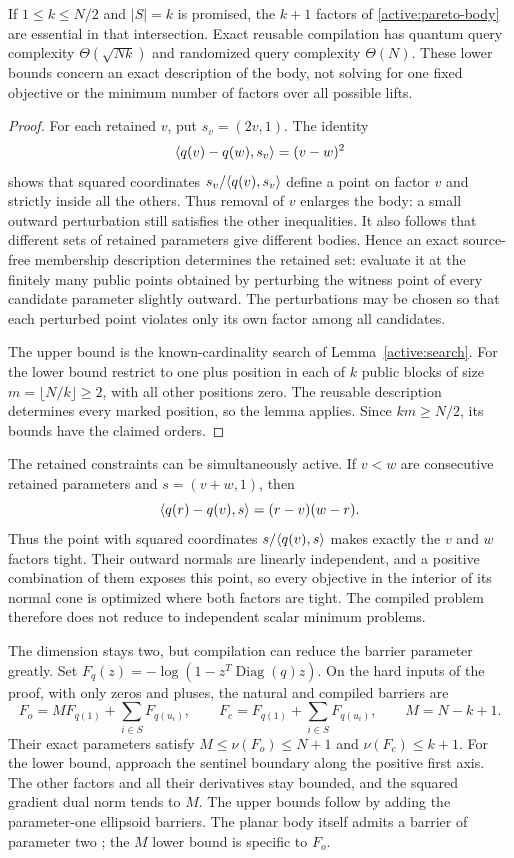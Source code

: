 \begin{proposition}\label{active:pareto}
If $1\leq k\leq N/2$ and $|S|=k$ is promised, the $k+1$
factors of \eqref{active:pareto-body} are essential in that intersection.
Exact reusable compilation
has quantum query complexity $\Theta(\sqrt{Nk})$ and randomized query
complexity $\Theta(N)$. These lower bounds concern an exact description
of the body, not solving for one fixed objective or the minimum number
of factors over all possible lifts.
\end{proposition}
\begin{proof}
For each retained $v$, put $s_v=(2v,1)$. The identity
\[
 \langle q(v)-q(w),s_v\rangle=(v-w)^2
\]
shows that squared coordinates
$s_v/\langle q(v),s_v\rangle$ define a point on factor $v$ and strictly
inside all the others. Thus removal of $v$ enlarges the body:
a small outward perturbation still satisfies the other inequalities.
It also follows that different sets of retained parameters give
different bodies. Hence an exact source-free membership description
determines the retained set: evaluate it at the
finitely many public points obtained by perturbing the witness point
of every candidate parameter slightly outward. The perturbations may
be chosen so that each perturbed point violates only its own factor
among all candidates.

The upper bound is the known-cardinality search of
Lemma~\ref{active:search}. For the lower bound restrict to one plus
position in each of $k$ public blocks of size
$m=\lfloor N/k\rfloor\geq2$, with all other positions zero.
The reusable description determines every marked position, so the
lemma applies. Since $km\geq N/2$, its bounds have the claimed orders.
\end{proof}

The retained constraints can be simultaneously active. If $v<w$
are consecutive retained parameters and $s=(v+w,1)$, then
\[
 \langle q(r)-q(v),s\rangle=(r-v)(w-r).
\]
Thus the point with squared coordinates $s/\langle q(v),s\rangle$ makes exactly
the $v$ and $w$ factors tight. Their outward normals are linearly
independent, and a positive combination of them exposes this point, so
every objective in the interior of its normal cone is optimized where
both factors are tight. The compiled problem therefore does not reduce
to independent scalar minimum problems.

The dimension stays two, but compilation can reduce the barrier
parameter greatly.
Set $F_q(z)=-\log(1-z^T\operatorname{Diag}(q)z)$.
On the hard inputs of the proof, with only zeros and pluses, the
natural and compiled barriers are
\begin{equation}\label{active:pareto-barriers}
 F_o=M F_{q(1)}+\sum_{i\in S}F_{q(u_i)},\qquad
 F_c=F_{q(1)}+\sum_{i\in S}F_{q(u_i)},\qquad M=N-k+1.
\end{equation}
Their exact parameters satisfy
$M\leq\nu(F_o)\leq N+1$ and $\nu(F_c)\leq k+1$.
For the lower bound, approach the sentinel boundary along the positive
first axis. The other factors and all their derivatives stay bounded,
and the squared gradient dual norm tends to $M$. The upper bounds
follow by adding the parameter-one ellipsoid barriers.
The planar body itself admits a barrier of parameter two
\cite{LeeYue2021}; the $M$ lower bound is specific to $F_o$.

